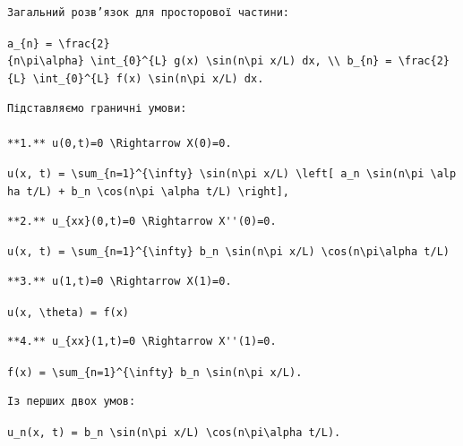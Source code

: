 \documentclass[
  ukrainian,
]{article}
\begin{document}
\begin{verbatim}
Загальний розв’язок для просторової частини:
\end{verbatim}

\texttt{a\_\{n\}\ =\ \textbackslash{}frac\{2\}\{n\textbackslash{}pi\textbackslash{}alpha\}\ \textbackslash{}int\_\{0\}\^{}\{L\}\ g(x)\ \textbackslash{}sin(n\textbackslash{}pi\ x/L)\ dx,\ \textbackslash{}\textbackslash{}\ b\_\{n\}\ =\ \textbackslash{}frac\{2\}\{L\}\ \textbackslash{}int\_\{0\}\^{}\{L\}\ f(x)\ \textbackslash{}sin(n\textbackslash{}pi\ x/L)\ dx.}

\begin{verbatim}
Підставляємо граничні умови:

**1.** u(0,t)=0 \Rightarrow X(0)=0.
\end{verbatim}

\texttt{u(x,\ t)\ =\ \textbackslash{}sum\_\{n=1\}\^{}\{\textbackslash{}infty\}\ \textbackslash{}sin(n\textbackslash{}pi\ x/L)\ \textbackslash{}left{[}\ a\_n\ \textbackslash{}sin(n\textbackslash{}pi\ \textbackslash{}alpha\ t/L)\ +\ b\_n\ \textbackslash{}cos(n\textbackslash{}pi\ \textbackslash{}alpha\ t/L)\ \textbackslash{}right{]},}

\begin{verbatim}
**2.** u_{xx}(0,t)=0 \Rightarrow X''(0)=0.
\end{verbatim}

\texttt{u(x,\ t)\ =\ \textbackslash{}sum\_\{n=1\}\^{}\{\textbackslash{}infty\}\ b\_n\ \textbackslash{}sin(n\textbackslash{}pi\ x/L)\ \textbackslash{}cos(n\textbackslash{}pi\textbackslash{}alpha\ t/L)}

\begin{verbatim}
**3.** u(1,t)=0 \Rightarrow X(1)=0.
\end{verbatim}

\texttt{u(x,\ \textbackslash{}theta)\ =\ f(x)}

\begin{verbatim}
**4.** u_{xx}(1,t)=0 \Rightarrow X''(1)=0.
\end{verbatim}

\texttt{f(x)\ =\ \textbackslash{}sum\_\{n=1\}\^{}\{\textbackslash{}infty\}\ b\_n\ \textbackslash{}sin(n\textbackslash{}pi\ x/L).}

\begin{verbatim}
Із перших двох умов:
\end{verbatim}

\texttt{u\_n(x,\ t)\ =\ b\_n\ \textbackslash{}sin(n\textbackslash{}pi\ x/L)\ \textbackslash{}cos(n\textbackslash{}pi\textbackslash{}alpha\ t/L).}
\end{document}
